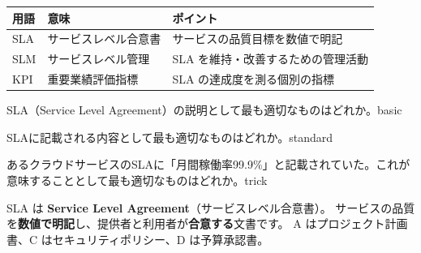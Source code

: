 \begin{comparison}
\begin{tabularx}{\textwidth}{lXX}
  \toprule
  \textbf{用語} & \textbf{意味} & \textbf{ポイント} \\
  \midrule
  SLA & サービスレベル合意書 & サービスの品質目標を数値で明記 \\
  SLM & サービスレベル管理 & SLA を維持・改善するための管理活動 \\
  KPI & 重要業績評価指標 & SLA の達成度を測る個別の指標 \\
  \bottomrule
\end{tabularx}
\end{comparison}


\begin{mondai}{SLA（Service Level Agreement）の説明として最も適切なものはどれか。}{basic}
\end{mondai}

\begin{mondai}{SLAに記載される内容として最も適切なものはどれか。}{standard}
\end{mondai}

\begin{mondai}{あるクラウドサービスのSLAに「月間稼働率99.9\%」と記載されていた。これが意味することとして最も適切なものはどれか。}{trick}
\end{mondai}

\kaitoupage

\begin{kaisetsu}
SLA は \textbf{Service Level Agreement}（サービスレベル合意書）。
サービスの品質を\textbf{数値で明記}し、提供者と利用者が\textbf{合意する}文書です。
A はプロジェクト計画書、C はセキュリティポリシー、D は予算承認書。
\end{kaisetsu}


